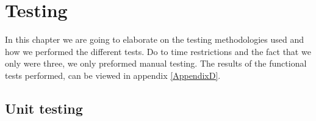 
\chapter{Testing}
\label{Testing}
\nocite{SoftwareTesting}










In this chapter we are going to elaborate on the testing methodologies used and how we performed the different tests.
Do to time restrictions and the fact that we only were three, we only preformed manual testing.
The results of the functional tests performed, can be viewed in appendix \ref{AppendixD}.

\section{Unit testing}

